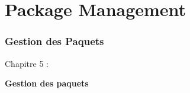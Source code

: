 %

\section{Package Management}
\begin{frame}[fragile]
	\frametitle{Gestion des Paquets}

	\begin{center}\huge{Chapitre 5 :}\end{center}
	\begin{center}\huge{\color{typo3darkgrey}\textbf{Gestion des paquets}}\end{center}

\end{frame}


